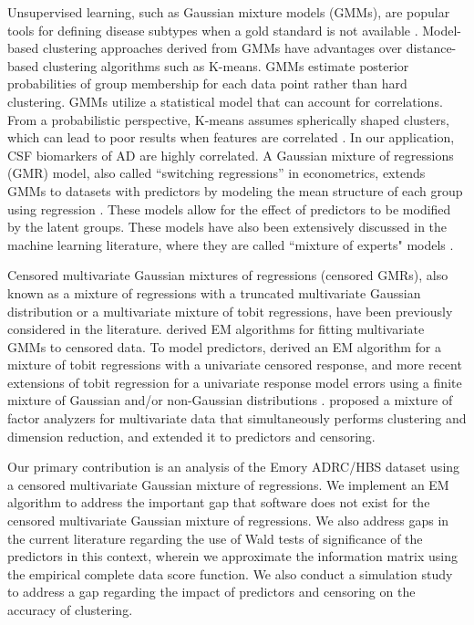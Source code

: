 \documentclass{interact}
\theoremstyle{plain}
\theoremstyle{definition}
\theoremstyle{remark}
\begin{document}
 

Unsupervised learning, such as Gaussian mixture models (GMMs), are popular tools for defining disease subtypes when a gold standard is not available \citep{Collins2014}. Model-based clustering approaches derived from GMMs have advantages over distance-based clustering algorithms such as K-means. GMMs estimate posterior probabilities of group membership for each data point rather than hard clustering. GMMs utilize a statistical model that can account for correlations.  From a probabilistic perspective, K-means assumes spherically shaped clusters, which can lead to poor results when features are correlated \citep{Coates2012}. In our application, CSF biomarkers of AD are highly correlated. A Gaussian mixture of regressions (GMR) model, also called ``switching regressions'' in econometrics, extends GMMs to datasets with predictors by modeling the mean structure of each group using regression \citep{Goldfeld1973,Quandt1978}. These models allow for the effect of predictors to be modified by the latent groups. These models have also been extensively discussed in the machine learning literature, where they are called ``mixture of experts" models \citep{Yuksel2012}.  

Censored multivariate Gaussian mixtures of regressions (censored GMRs), also known as a mixture of regressions with a truncated multivariate Gaussian distribution or a multivariate mixture of tobit regressions, have been previously considered in the literature. \cite{Lee2012} derived EM algorithms for fitting multivariate GMMs to censored data. To model predictors, \cite{Jedidi1993} derived an EM algorithm for a mixture of tobit regressions with a univariate censored response, and more recent extensions of tobit regression for a univariate response model errors using a finite mixture of Gaussian and/or non-Gaussian distributions  \citep{Hanson2002, Caudill2012, Karlsson2014, Garay2017, zeller2019finite}. \cite{Wang2019} proposed a mixture of factor analyzers for multivariate data that simultaneously performs clustering and dimension reduction, and \cite{Wang2021} extended it to predictors and censoring. 

Our primary contribution is an analysis of the Emory ADRC/HBS dataset using a censored multivariate Gaussian mixture of regressions. We implement an EM algorithm to address the important gap that software does not exist for the censored multivariate Gaussian mixture of regressions. We also address gaps in the current literature regarding the use of Wald tests of significance of the predictors in this context, wherein we approximate the information matrix using the empirical complete data score function. We also conduct a simulation study to address a gap regarding the impact of predictors and censoring on the accuracy of clustering. 
\end{document}
